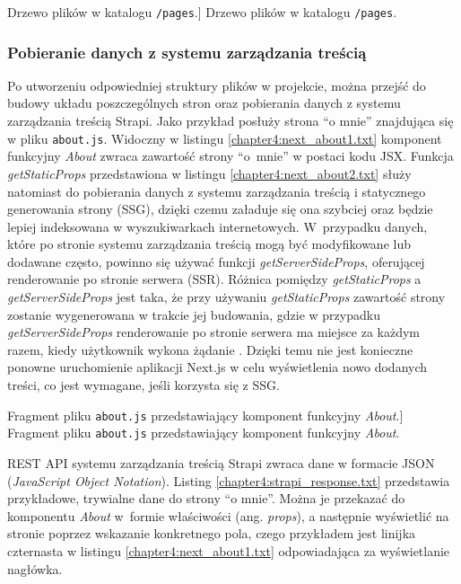 \documentclass[a4paper, 12pt, twoside]{article}
\numberwithin{figure}{section}
\begin{document}
\begin{sloppypar}
\begin{code}[htbp]
    
    \caption
    [Drzewo plików w katalogu \texttt{/pages}.]
    {Drzewo plików w katalogu \texttt{/pages}.}
    \label{chapter4:tree}
\end{code}

\subsubsection*{Pobieranie danych z systemu zarządzania treścią}

Po utworzeniu odpowiedniej struktury plików w projekcie, można przejść do budowy układu poszczególnych stron oraz pobierania danych z systemu zarządzania treścią Strapi. Jako przykład posłuży strona ``o mnie'' znajdująca się w pliku \texttt{about.js}. Widoczny w listingu \ref{chapter4:next_about1.txt} komponent funkcyjny \textit{About} zwraca zawartość strony ``o~mnie'' w postaci kodu JSX. Funkcja \textit{getStaticProps} przedstawiona w listingu \ref{chapter4:next_about2.txt} służy natomiast do pobierania danych z systemu zarządzania treścią i statycznego generowania strony (SSG), dzięki czemu załaduje się ona szybciej oraz będzie lepiej indeksowana w wyszukiwarkach internetowych. W~przypadku danych, które po stronie systemu zarządzania treścią mogą być modyfikowane lub dodawane często, powinno się używać funkcji \textit{getServerSideProps}, oferującej renderowanie po stronie serwera (SSR). Różnica pomiędzy \textit{getStaticProps} a \textit{getServerSideProps} jest taka, że przy używaniu \textit{getStaticProps} zawartość strony zostanie wygenerowana w trakcie jej budowania, gdzie w przypadku \textit{getServerSideProps} renderowanie po stronie serwera ma miejsce za każdym razem, kiedy użytkownik wykona żądanie \cite{nextdocs}. Dzięki temu nie jest konieczne ponowne uruchomienie aplikacji Next.js w celu wyświetlenia nowo dodanych treści, co jest wymagane, jeśli korzysta się z SSG. 

\begin{code}[htbp]
    
    \caption
    [Fragment pliku \texttt{about.js} przedstawiający komponent funkcyjny \textit{About}.]
    {Fragment pliku \texttt{about.js} przedstawiający komponent funkcyjny \textit{About}.}
    \label{chapter4:next_about1.txt}
\end{code}

\newpage

REST API systemu zarządzania treścią Strapi zwraca dane w formacie JSON (\textit{JavaScript Object Notation}). Listing \ref{chapter4:strapi_response.txt} przedstawia przykładowe, trywialne dane do strony ``o mnie''. Można je przekazać do komponentu \textit{About} w~formie właściwości (ang. \textit{props}), a następnie wyświetlić na stronie poprzez wskazanie konkretnego pola, czego przykładem jest linijka czternasta 
w listingu \ref{chapter4:next_about1.txt} odpowiadająca za wyświetlanie nagłówka.


\end{sloppypar}
\end{document}
